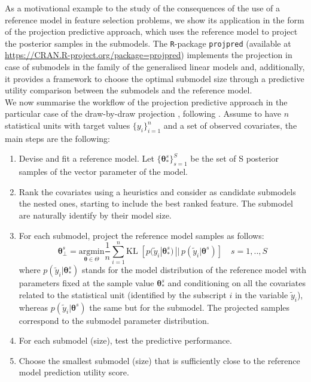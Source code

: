 \documentclass[american,]{article}
\theoremstyle{definition}
\begin{document}
As a motivational example to the study of the consequences of the use of a reference model in feature selection problems, we show its application in the form of the projection predictive approach, which uses the reference model to project the posterior samples in the submodels. The \texttt{R}-package \texttt{projpred} (available at \url{https://CRAN.R-project.org/package=projpred}) implements the projection in case of submodels in the family of the generalised linear models and, additionally, it provides a framework to choose the optimal submodel size through a predictive utility comparison between the submodels and the reference model. 
\\
We now summarise the workflow of the projection predictive approach in the particular case of the draw-by-draw projection \cite[original formulation by][]{paper:original_proj}, following \cite{paper:projpred}. Assume to have $n$ statistical units with target values $\{y_{i}\}_{i=1}^{n}$ and a set of observed covariates, the main steps are the following:
\begin{enumerate}
\item Devise and fit a reference model. Let $\{\boldsymbol{\theta}_{*}^{s}\}_{s=1}^{S}$ be the set of S posterior samples of the vector parameter of the model.
\item Rank the covariates using a heuristics and consider as candidate submodels the nested ones, starting to include the best ranked feature. The submodel are naturally identify by their model size.
\item For each submodel, project the reference model samples as follows:
\begin{equation}\label{eq:draw_by_draw}
\boldsymbol{\theta}_{\perp}^{s} = \underset{\boldsymbol{\theta}\in\Theta}{\text{argmin}} \frac{1}{n}\sum_{i=1}^{n}\text{KL}\;[p(\tilde{y}_{i}|\boldsymbol{\theta}_{*}^{s})\,||\,p(\tilde{y}_{i}|\boldsymbol{\theta}^{s})] \quad s=1,..,S
\end{equation}
where $p(\tilde{y}_{i}|\boldsymbol{\theta}_{*}^{s})$ stands for the model distribution of the reference model with parameters fixed at the sample value $\boldsymbol{\theta}_{*}^{s}$ and conditioning on all the covariates related to the statistical unit (identified by the subscript $i$ in the variable $\tilde{y}_{i}$), whereas $p(\tilde{y}_{i}|\boldsymbol{\theta}^{s})$ the same but for the submodel. The projected samples correspond to the submodel parameter distribution.
\item For each submodel (size), test the predictive performance.
\item Choose the smallest submodel (size) that is sufficiently close to the reference model prediction utility score.
\end{enumerate} 
\end{document}
